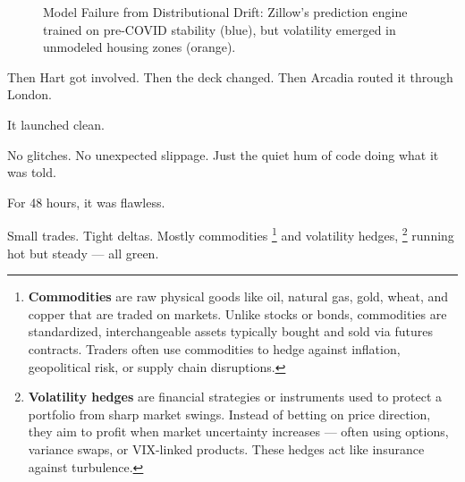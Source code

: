 \medskip

\begin{figure}[H]
  \centering
  \caption{Model Failure from Distributional Drift: Zillow’s prediction engine trained on pre-COVID stability (blue), but volatility emerged in unmodeled housing zones (orange).}
\end{figure}


  



Then Hart got involved.
Then the deck changed.
Then Arcadia routed it through London.

It launched clean.

No glitches. No unexpected slippage.
Just the quiet hum of code doing what it was told.

For 48 hours, it was flawless.

Small trades.
Tight deltas.
Mostly commodities
\footnote{\textbf{Commodities} are raw physical goods like oil, natural gas, gold, wheat, and copper that are traded 
on markets. Unlike stocks or bonds, commodities are standardized, interchangeable assets typically bought and sold via 
futures contracts. Traders often use commodities to hedge against inflation, geopolitical risk, or supply chain 
disruptions.}
and volatility hedges, 
\footnote{\textbf{Volatility hedges} are financial strategies or instruments used to protect a portfolio from sharp market 
swings. Instead of betting on price direction, they aim to profit when market uncertainty increases — often using options, 
variance swaps, or VIX-linked products. These hedges act like insurance against turbulence.}
running hot but steady — all green.

